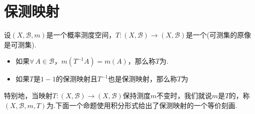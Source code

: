 \section{保测映射}

\vspace{-0.5 em}
\begin{definition}[保测映射]
    设$(X,\mathcal{B},m)$是一个概率测度空间，$T:(X,\mathcal{B}) \to (X,\mathcal{B})$是一个(可测集的原像是可测集).
    \begin{itemize}
        \item 如果$\forall\, A\in\mathcal{B}$，$m(T^{-1}A)=m(A)$，那么称$T$为.
        \item 如果$T$是$1-1$的保测映射且$T^{-1}$也是保测映射，那么称$T$为
    \end{itemize}
\end{definition}
特别地，当映射$T:(X,\mathcal{B}) \to (X,\mathcal{B})$保持测度$m$不变时，我们就说$m$是$T$的，称$(X,\mathcal{B},m,T)$为.下面一个命题使用积分形式给出了保测映射的一个等价刻画.

